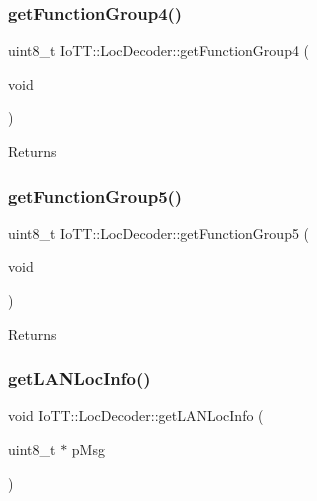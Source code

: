 \subsubsection{\texorpdfstring{get\+Function\+Group4()}{getFunctionGroup4()}}
{\footnotesize\ttfamily uint8\+\_\+t Io\+T\+T\+::\+Loc\+Decoder\+::get\+Function\+Group4 (\begin{DoxyParamCaption}\item[{void}]{ }\end{DoxyParamCaption})}

\begin{DoxyReturn}{Returns}

\end{DoxyReturn}
\mbox{\label{classIoTT_1_1LocDecoder_a1bd40f11b3af2beac3804cd3eb731aae}} 
\subsubsection{\texorpdfstring{get\+Function\+Group5()}{getFunctionGroup5()}}
{\footnotesize\ttfamily uint8\+\_\+t Io\+T\+T\+::\+Loc\+Decoder\+::get\+Function\+Group5 (\begin{DoxyParamCaption}\item[{void}]{ }\end{DoxyParamCaption})}

\begin{DoxyReturn}{Returns}

\end{DoxyReturn}
\mbox{\label{classIoTT_1_1LocDecoder_a395369fe38be49fe123a915562a5e1b5}} 
\subsubsection{\texorpdfstring{get\+L\+A\+N\+Loc\+Info()}{getLANLocInfo()}}
{\footnotesize\ttfamily void Io\+T\+T\+::\+Loc\+Decoder\+::get\+L\+A\+N\+Loc\+Info (\begin{DoxyParamCaption}\item[{uint8\+\_\+t $\ast$}]{p\+Msg }\end{DoxyParamCaption})}


